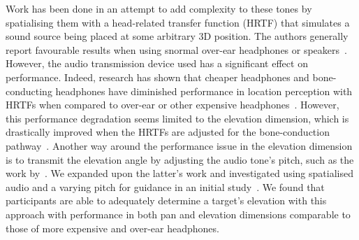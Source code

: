 \documentclass[acmsmall]{acmart}
\begin{document}

Work has been done in an attempt to add complexity to these tones by spatialising them with a head-related transfer function (HRTF) that simulates a sound source being placed at some arbitrary 3D position.
The authors generally report favourable results when using snormal over-ear headphones or speakers~\citep{geronazzo2016interactive,wilson2007swan,katz2010navig,blum2013spatialized}.
However, the audio transmission device used has a significant effect on performance.
Indeed, research has shown that cheaper headphones and bone-conducting headphones have diminished performance in location perception with HRTFs when compared to over-ear or other expensive headphones~\citep{stanley2006lateralization}.
However, this performance degradation seems limited to the elevation dimension, which is drastically improved when the HRTFs are adjusted for the bone-conduction pathway~\citep{stanley2006lateralization}.
Another way around the performance issue in the elevation dimension is to transmit the elevation angle by adjusting the audio tone's pitch, such as the work by~\citet{durette2008visuo}.
We expanded upon the latter's work and investigated using spatialised audio and a varying pitch for guidance in an initial study~\cite{lock2019bone}.
We found that participants are able to adequately determine a target's elevation with this approach with performance in both pan and elevation dimensions comparable to those of more expensive and over-ear headphones.
\end{document}
